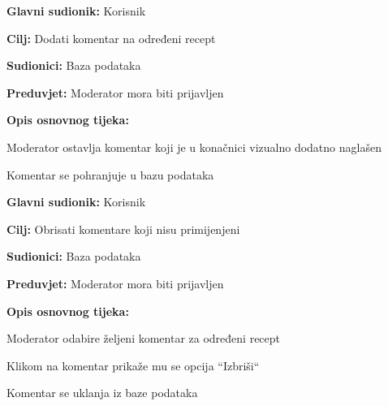 \noindent {}
\begin{packed_item}

	\item \textbf{Glavni sudionik: } Korisnik
	\item  \textbf{Cilj:} Dodati komentar na određeni recept
	\item  \textbf{Sudionici:} Baza podataka
	\item  \textbf{Preduvjet:} Moderator mora biti prijavljen
	\item  \textbf{Opis osnovnog tijeka:}

	\item[] \begin{packed_enum}

		\item Moderator ostavlja komentar koji je u konačnici vizualno dodatno naglašen
		\item Komentar se pohranjuje u bazu podataka \newline
	\end{packed_enum}
\end{packed_item}

\noindent {}
\begin{packed_item}

	\item \textbf{Glavni sudionik: } Korisnik
	\item  \textbf{Cilj:} Obrisati komentare koji nisu primijenjeni
	\item  \textbf{Sudionici:} Baza podataka
	\item  \textbf{Preduvjet:} Moderator mora biti prijavljen
	\item  \textbf{Opis osnovnog tijeka:}

	\item[] \begin{packed_enum}

		\item Moderator odabire željeni komentar za određeni recept
		\item Klikom na komentar prikaže mu se opcija “Izbriši“
		\item Komentar se uklanja iz baze podataka
	\end{packed_enum}
\end{packed_item}

